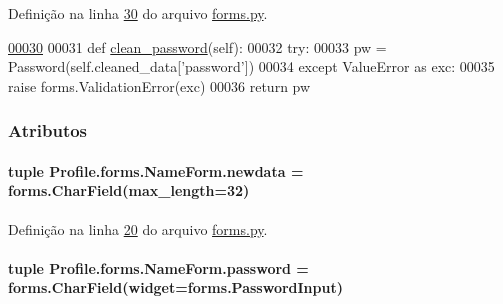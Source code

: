 Definição na linha \hyperlink{Profile_2forms_8py_source_l00030}{30} do arquivo \hyperlink{Profile_2forms_8py_source}{forms.\-py}.


\begin{DoxyCode}
\hypertarget{classProfile_1_1forms_1_1NameForm_l00030}{}\hyperlink{classProfile_1_1forms_1_1NameForm_a681fa28036a241632b8688d436f04a49}{00030} 
00031     \textcolor{keyword}{def }\hyperlink{classProfile_1_1forms_1_1NameForm_a681fa28036a241632b8688d436f04a49}{clean\_password}(self):
00032         \textcolor{keywordflow}{try}:
00033             pw = Password(self.cleaned\_data[\textcolor{stringliteral}{'password'}])
00034         \textcolor{keywordflow}{except} ValueError \textcolor{keyword}{as} exc:
00035             \textcolor{keywordflow}{raise} forms.ValidationError(exc)
00036         \textcolor{keywordflow}{return} pw

\end{DoxyCode}


\subsubsection{Atributos}
\hypertarget{classProfile_1_1forms_1_1NameForm_a6ebfb316b263c162dd3895b1da149eda}{
\paragraph[{newdata}]{\setlength{\rightskip}{0pt plus 5cm}tuple Profile.\-forms.\-Name\-Form.\-newdata = forms.\-Char\-Field(max\-\_\-length=32)\hspace{0.3cm}{\ttfamily [static]}}}\label{classProfile_1_1forms_1_1NameForm_a6ebfb316b263c162dd3895b1da149eda}


Definição na linha \hyperlink{Profile_2forms_8py_source_l00020}{20} do arquivo \hyperlink{Profile_2forms_8py_source}{forms.\-py}.

\hypertarget{classProfile_1_1forms_1_1NameForm_a5a6959db0132c607a56f9cda75769ecf}{
\paragraph[{password}]{\setlength{\rightskip}{0pt plus 5cm}tuple Profile.\-forms.\-Name\-Form.\-password = forms.\-Char\-Field(widget=forms.\-Password\-Input)\hspace{0.3cm}{\ttfamily [static]}}}\label{classProfile_1_1forms_1_1NameForm_a5a6959db0132c607a56f9cda75769ecf}


